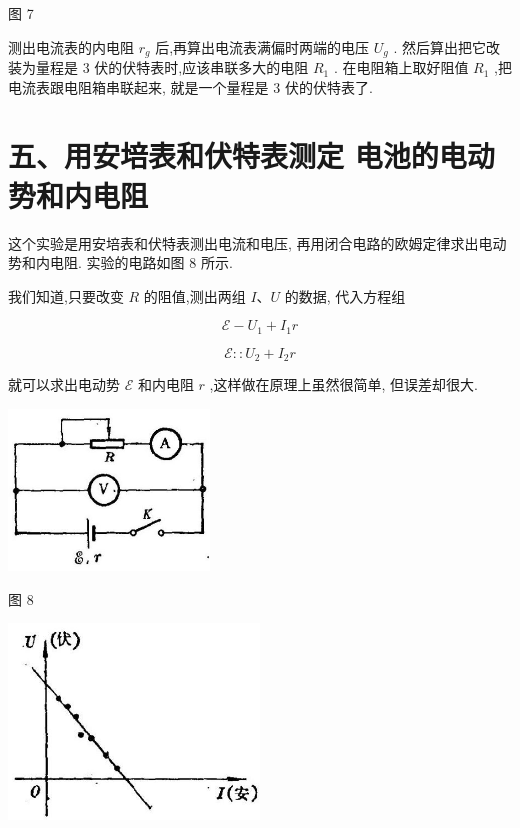 \documentclass[10pt]{article}
\begin{document}
图 7

测出电流表的内电阻 \({r}_{g}\) 后,再算出电流表满偏时两端的电压 \({U}_{g}\) . 然后算出把它改装为量程是 3 伏的伏特表时,应该串联多大的电阻 \({R}_{1}\) . 在电阻箱上取好阻值 \({R}_{1}\) ,把电流表跟电阻箱串联起来, 就是一个量程是 3 伏的伏特表了.

\section*{五、用安培表和伏特表测定 电池的电动势和内电阻}

这个实验是用安培表和伏特表测出电流和电压, 再用闭合电路的欧姆定律求出电动势和内电阻. 实验的电路如图 8 所示.

我们知道,只要改变 \(R\) 的阻值,测出两组 \(I\text{、}U\) 的数据, 代入方程组

\[
\mathcal{E} - {U}_{1} + {I}_{1}r
\]

\[
\mathcal{E} : : {U}_{2} + {I}_{2}r
\]

就可以求出电动势 \(\mathcal{E}\) 和内电阻 \(r\) ,这样做在原理上虽然很简单, 但误差却很大.

\begin{center}
\includegraphics[max width=0.4\textwidth]{images/01913056-1f15-74d8-9184-9aab52c9d66b_379_731232.jpg}
\end{center}

图 8

\begin{center}
\includegraphics[max width=0.5\textwidth]{images/01913056-1f15-74d8-9184-9aab52c9d66b_379_390211.jpg}
\end{center}
\end{document}
